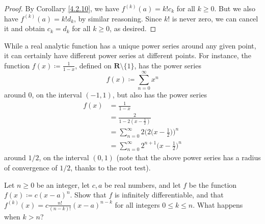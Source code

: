 \begin{proof}
    By Corollary \ref{4.2.10}, we have \(f^{(k)}(a) = k! c_k\) for all \(k \geq 0\).
    But we also have \(f^{(k)}(a) = k! d_k\), by similar reasoning.
    Since \(k!\) is never zero, we can cancel it and obtain \(c_k = d_k\) for all \(k \geq 0\), as desired.
\end{proof}

\begin{remark}\label{4.2.13}
    While a real analytic function has a unique power series around any given point, it can certainly have different power series at different points.
    For instance, the function \(f(x) \coloneqq \frac{1}{1 - x}\), defined on \(\mathbf{R} \setminus \{1\}\), has the power series
    \[
        f(x) \coloneqq \sum_{n = 0}^\infty x^n
    \]
    around \(0\), on the interval \((-1, 1)\), but also has the power series
    \begin{align*}
        f(x) & = \frac{1}{1 - x}                                                  \\
             & = \frac{2}{1 - 2(x - \frac{1}{2})}                                 \\
             & = \sum_{n = 0}^\infty 2 \bigg(2\bigg(x - \frac{1}{2}\bigg)\bigg)^n \\
             & = \sum_{n = 0}^\infty 2^{n + 1} \bigg(x - \frac{1}{2}\bigg)^n
    \end{align*}
    around \(1 / 2\), on the interval \((0, 1)\)
    (note that the above power series has a radius of convergence of \(1 / 2\), thanks to the root test).
\end{remark}

\exercisesection

\begin{exercise}\label{ex 4.2.1}
    Let \(n \geq 0\) be an integer, let \(c, a\) be real numbers, and let \(f\) be the function \(f(x) \coloneqq c (x - a)^n\).
    Show that \(f\) is infinitely differentiable, and that \(f^{(k)}(x) = c \frac{n!}{(n - k)!} (x - a)^{n - k}\) for all integers \(0 \leq k \leq n\).
    What happens when \(k > n\)?
\end{exercise}

